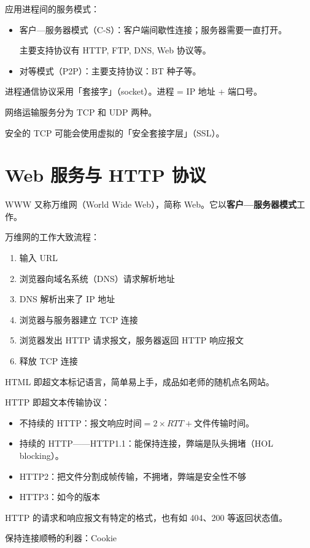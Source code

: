 \documentclass[UTF8]{ctexart}
\begin{document}
应用进程间的服务模式：
\begin{itemize}
  \item 客户—服务器模式（C-S）：客户端间歇性连接；服务器需要一直打开。

  主要支持协议有 HTTP, FTP, DNS, Web 协议等。

  \item 对等模式（P2P）：主要支持协议：BT 种子等。
\end{itemize}

进程通信协议采用「套接字」（socket）。进程 = IP 地址 + 端口号。

网络运输服务分为 TCP 和 UDP 两种。

安全的 TCP 可能会使用虚拟的「安全套接字层」（SSL）。

\section{Web 服务与 HTTP 协议}
WWW 又称万维网（World Wide Web），简称 Web。它以\textbf{客户—服务器模式}工作。

万维网的工作大致流程：
\begin{enumerate}[itemsep=0pt,parsep=0pt]
  \item 输入 URL
  \item 浏览器向域名系统（DNS）请求解析地址
  \item DNS 解析出来了 IP 地址
  \item 浏览器与服务器建立 TCP 连接
  \item 浏览器发出 HTTP 请求报文，服务器返回 HTTP 响应报文
  \item 释放 TCP 连接
\end{enumerate}

HTML 即超文本标记语言，简单易上手，成品如老师的随机点名网站。

HTTP 即超文本传输协议：
\begin{itemize}[itemsep=0pt,parsep=0pt]
  \item 不持续的 HTTP：报文响应时间$ = 2\times RTT + $文件传输时间。
  \item 持续的 HTTP——HTTP1.1：能保持连接，弊端是队头拥堵（HOL blocking）。
  \item HTTP2：把文件分割成帧传输，不拥堵，弊端是安全性不够
  \item HTTP3：如今的版本
\end{itemize}

HTTP 的请求和响应报文有特定的格式，也有如 404、200 等返回状态值。

保持连接顺畅的利器：Cookie
\end{document}
